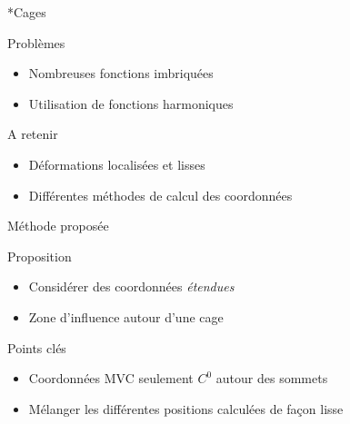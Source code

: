 \documentclass[xcolor=x11names,compress]{beamer}
\renewcommand{\(}{\begin{columns}} \renewcommand{\)}{\end{columns}}
\newcommand{\<}[1]{\begin{column}{#1}} \renewcommand{\>}{\end{column}}
\begin{document}
\begin{frame}{*Cages}
  \begin{alertblock}{Problèmes}
    \begin{itemize}
    \item Nombreuses fonctions imbriquées
    \item Utilisation de fonctions harmoniques
    \end{itemize}
  \end{alertblock}
  \begin{exampleblock}{A retenir}
    \begin{itemize}
    \item Déformations localisées et lisses
    \item Différentes méthodes de calcul des coordonnées
    \end{itemize}
  \end{exampleblock}
\end{frame}

\begin{frame}{Méthode proposée}
  \begin{block}{Proposition}
    \begin{itemize}
    \item Considérer des coordonnées \textit{étendues}
    \item Zone d'influence autour d'une cage
    \end{itemize}
  \end{block}
  \begin{alertblock}{Points clés}
    \begin{itemize}
    \item Coordonnées MVC seulement $C^0$ autour des sommets
    \item Mélanger les différentes positions calculées de façon lisse
    \end{itemize}
  \end{alertblock}
\end{frame}

\end{document}

